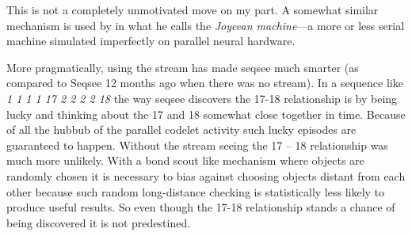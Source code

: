 This is not a completely unmotivated move on my part.  A somewhat similar mechanism is used by  in what he calls the \emph{Joycean machine}---a more or less serial machine simulated imperfectly on parallel neural hardware.

More pragmatically, using the stream has made seqsee much smarter (as compared to Seqsee 12 months ago when there was no stream).  In a sequence like \emph{1 1 1 1 17 2 2 2 2 18} the way seqsee discovers the 17-18 relationship is by being lucky and thinking about the 17 and 18 somewhat close together in time.  Because of all the hubbub of the parallel codelet activity such lucky episodes are guaranteed to happen.  Without the stream seeing the 17 -- 18 relationship was much more unlikely.  With a bond scout like mechanism where objects are randomly chosen it is necessary to bias against choosing objects distant from each other because such random long-distance checking is statistically less likely to produce useful results.  So even though the 17-18 relationship stands a chance of being discovered it is not predestined.


%
%
%
